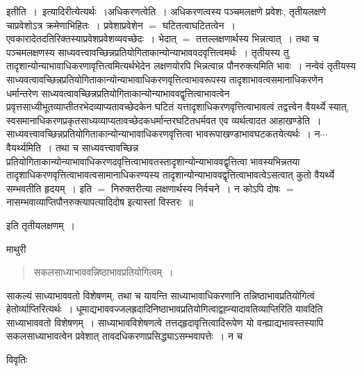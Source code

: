 \documentclass[10pt, openany]{book}
\begin{document}
{{\la इतीति~।}~इत्यादिरीत्येत्यर्थः~।{\la अधिकरणत्वेति~।} अधिकरणत्वस्य पञ्चमलक्षणे प्रवेशः, तृतीयलक्षणे चाप्रवेशोऽत्र क्रमेणाभिहितः~। प्रवेशाप्रवेशेन $=$ घटितत्वाघटितत्वेन~। एवकारादेतदतिरिक्तस्याप्रवेशप्रवेशव्यवच्छेदः~। भेदात् $=$ तत्तल्लक्षणार्थस्य भिन्नत्वात्~। तथा च पञ्चमलक्षणस्य साध्यवत्त्वावच्छिन्नप्रतियोगिताकान्योन्याभाववदवृत्तित्वमर्थः~। तृतीयस्य तु तादृशान्योन्याभावाधिकरणावृत्तित्वमित्यर्थभेदेन लक्षणयोरपि भिन्नत्वान्न पौनरुक्त्यमिति भावः~। नन्वेवं तृतीयस्य साध्यवत्वावच्छिन्नप्रतियोगिताकान्योन्याभावाधिकरणवृत्तित्वाभावरूपस्य तादृशाभावत्वसमानाधिकरणेन धर्मान्तरेण साध्यवत्वावच्छिन्नप्रतियोगिताकान्योन्याभाववद्वृत्तित्वाभावत्वेन प्रवृत्तसाध्यीभूतव्याप्तीतरभेदव्याप्यतावच्छेदकेन घटितं यत्तादृशाधिकरणवृत्तित्वाभावत्वं तद्वत्त्वेन वैयर्थ्ये
स्यात्, स्वसमानाधिकरणप्रकृतसाध्यव्याप्यतावच्छेदकधर्मान्तरघटितधर्मवत एव व्यर्थत्वादत आहाखण्डेति~। साध्यवत्त्वावच्छिन्नप्रतियोगिताकान्योन्याभावाधिकरणवृत्तित्वा
भावरूपाखण्डाभावघटकतयेत्यर्थः~। न$\cdots${\la वैयर्थ्यमिति~।} तथा च साध्यवत्त्वावच्छिन्न प्रतियोगिताकान्योन्याभावाधिकरणदवृत्तित्वाभावतस्तादृशान्योन्याभाववद्वृत्तित्वा भावस्यभिन्नतया तादृशाधिकरणवृत्तित्वाभावत्वसामानाधिकरण्यस्य
तादृशान्योन्याभाववद्वृत्तित्वाभावत्वेऽसत्वात् कुतो वैयर्थ्ये सम्भवतीति हृदयम्~। इति $=$ निरुक्तरीत्या लक्षणार्थस्य निर्वचने~। न कोऽपि दोषः $=$ नासम्भवाव्याप्तिपौनरुक्त्यापत्यादिदोष इत्यास्तां विस्तरः~॥
\begin{center}
इति तृतीयलक्षणम्~।
\end{center}
\newpage
\begin{center}  माथुरी  \end{center}
\begin{quote}
\vpc
सकलसाध्याभाववन्निष्ठाभावप्रतियोगित्वम्~।   
\end{quote}

{\la साकल्यं साध्याभाववतो विशेषणम्, तथा च यावन्ति साध्याभावाधिकरणानि तन्निष्ठाभावप्रतियोगित्वं हेतोर्व्याप्तिरित्यर्थः~। धूमाद्यभाववज्जलह्रदादिनिष्ठाभावप्रतियोगित्वाद्वह्न्यादावतिव्याप्तिरिति यावदिति साध्याभाववतो विशेषणम्~। साध्याभावविशेषणत्वे तत्तद्हृदावृत्तित्वादिरूपेण यो वन्ह्याद्यभावस्तस्यापि सकलसाध्याभावत्वेन प्रवेशात् तावदधिकरणाप्रसिद्ध्याऽसम्भवापत्तेः~। न च}
\begin{center}     विवृतिः \end{center}

}
\end{document}
